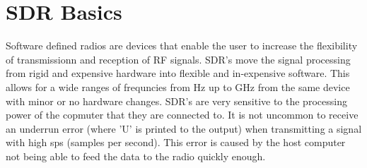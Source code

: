 
\section{SDR Basics}
Software defined radios are devices that enable the user to increase the flexibility of transmissionn and reception of RF signals. SDR's move the signal processing from
rigid and expensive hardware into flexible and in-expensive software. This allows for a wide ranges of frequncies from Hz up to GHz from the same device with minor or no
hardware changes. 
SDR's are very sensitive to the processing power of the copmuter that they are connected to. It is not uncommon to receive an underrun error (where 'U' is printed to the
output) when transmitting a signal with high sps (samples per second). This error is caused by the host computer not being able to feed the data to the radio quickly
enough.